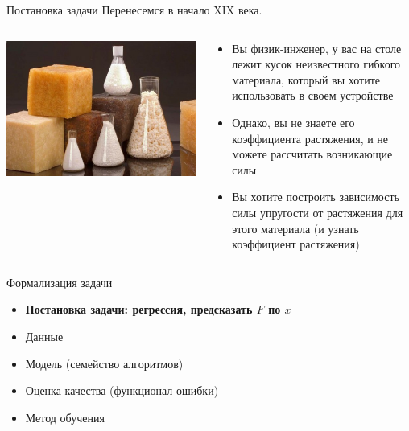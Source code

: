 \documentclass[aspectratio=169]{beamer}
\begin{document}
\begin{frame}{Постановка задачи}
    Перенесемся в начало XIX века.
    \vfill
    \begin{columns}
        \begin{column}{.4\linewidth}
            \includegraphics[width=\linewidth]{graphs/fig2.jpg}
        \end{column}
        \begin{column}{.6\linewidth}
            \small
            \begin{itemize}
                \item Вы физик-инженер, у вас на столе лежит кусок неизвестного гибкого материала,
                который вы хотите использовать в своем устройстве
                \pause
                \item Однако, вы не знаете его коэффициента растяжения, и не можете рассчитать
                возникающие силы
                \pause
                \item Вы хотите построить зависимость силы упругости от растяжения для этого
                материала (и узнать коэффициент растяжения)
            \end{itemize}
        \end{column}
    \end{columns}
\end{frame}

\begin{frame}{Формализация задачи}
    \begin{itemize}
        \item \textbf{Постановка задачи: регрессия, предсказать \( F \) по \( x \)}
        \item Данные
        \item Модель (семейство алгоритмов)
        \item Оценка качества (функционал ошибки)
        \item Метод обучения
    \end{itemize}
\end{frame}
\end{document}
